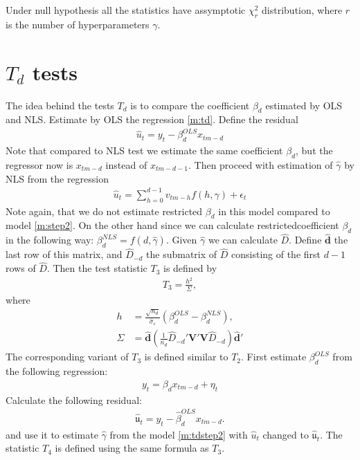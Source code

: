\documentclass{article}
\begin{document}
Under null hypothesis all the statistics have assymptotic $\chi^2_r$ distribution, where $r$ is the number of hyperparameters $\gamma$.
\section{$T_d$ tests}

The idea behind the tests $T_d$ is to compare the coefficient $\beta_d$ estimated by OLS and NLS. Estimate by OLS the regression \eqref{m:td}. Define the residual
\begin{align*}
    \hat{u}_t=y_t-\beta_d^{OLS}x_{tm-d}
\end{align*}
Note that compared to NLS test we estimate the same coefficient $\beta_d$, but the regressor now is $x_{tm-d}$ instead of $x_{tm-d-1}$. Then proceed with estimation of $\hat\gamma$ by NLS from the regression
\begin{align}\label{m:tdstep2}
    \hat{u}_t=\sum_{h=0}^{d-1}v_{tm-h}f(h,\gamma)+\epsilon_t
\end{align}
Note again, that we do not estimate restricted $\beta_d$ in this model compared to model \eqref{m:step2}. On the other hand since we can calculate restrictedcoefficient $\beta_d$ in the following way: $\beta_d^{NLS}=f(d,\hat\gamma)$. Given $\hat\gamma$ we can calculate $\hat D$. Define $\hat{\bm{d}}$ the last row of this matrix, and $\hat{D}_{-d}$ the submatrix of $\hat{D}$ consisting of the first $d-1$ rows of $\hat{D}$. Then the test statistic $T_3$ is defined by
\begin{align*}
    T_3=\frac{h^2}{\Sigma},
\end{align*}
where
\begin{align*}
    h&=\frac{\sqrt{n_d}}{\hat\sigma_{\varepsilon}}(\beta_d^{OLS}-\beta_d^{NLS}),\\
    \Sigma&=\hat{\bm{d}}\left(\frac{1}{n_d}\hat{D}_{-d}'\bm{V}'\bm{V}\hat{D}_{-d}\right)\hat{\bm{d}}'
\end{align*}
The corresponding variant of $T_3$ is defined similar to $T_2$. First estimate $\beta_d^{OLS}$ from the following regression:
\begin{align*}
    y_t=\beta_{d}x_{tm-d}+\eta_t
\end{align*}
Calculate the following residual:
\begin{align*}
    \hat{\mathfrak{u}}_{t}=y_t-\hat\beta_d^{OLS}x_{tm-d}.
\end{align*}
and use it to estimate $\hat\gamma$ from the model \eqref{m:tdstep2} with $\hat{u}_t$ changed to $\hat{\mathfrak{u}}_t$. The statistic $T_4$ is defined using the same formula as $T_3$. 
\end{document}
